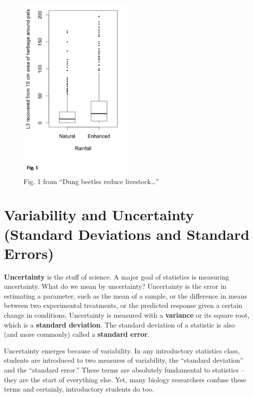 \documentclass[]{book}
\begin{document}
\begin{figure}
\centering
\includegraphics[width=0.50000\textwidth]{images/Dung_beetles_reduce_livestock-fig_1.png}
\caption{Fig. 1 from ``Dung beetles reduce livestock\ldots{}''}
\end{figure}

\chapter{Variability and Uncertainty (Standard Deviations and Standard
Errors)}\label{variability-and-uncertainty-standard-deviations-and-standard-errors}

\textbf{Uncertainty} is the stuff of science. A major goal of statistics
is measuring uncertainty. What do we mean by uncertainty? Uncertainty is
the error in estimating a parameter, such as the mean of a sample, or
the difference in means between two experimental treatments, or the
predicted response given a certain change in conditions. Uncertainty is
measured with a \textbf{variance} or its square root, which is a
\textbf{standard deviation}. The standard deviation of a statistic is
also (and more commonly) called a \textbf{standard error}.

Uncertainty emerges because of variability. In any introductory
statistics class, students are introduced to two measures of
variability, the ``standard deviation'' and the ``standard error.''
These terms are absolutely fundamental to statistics -- they are the
start of everything else. Yet, many biology researchers confuse these
terms and certainly, introductory students do too.
\end{document}
